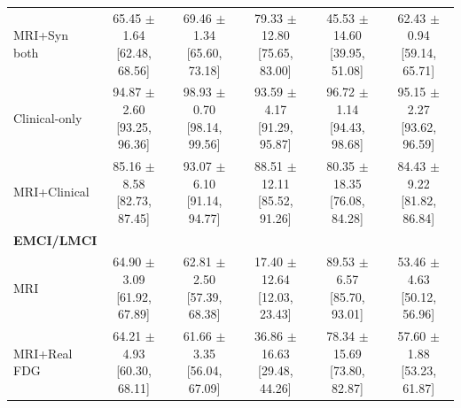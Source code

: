 \documentclass{article}
\begin{document}
\begin{landscape}
\begin{longtable}{lccccc}
MRI+Syn both & \shortstack{65.45 $\pm$ 1.64\\{}[62.48, 68.56]} & \shortstack{69.46 $\pm$ 1.34\\{}[65.60, 73.18]} & \shortstack{79.33 $\pm$ 12.80\\{}[75.65, 83.00]} & \shortstack{45.53 $\pm$ 14.60\\{}[39.95, 51.08]} & \shortstack{62.43 $\pm$ 0.94\\{}[59.14, 65.71]} \\
Clinical-only & \shortstack{94.87 $\pm$ 2.60\\{}[93.25, 96.36]} & \shortstack{98.93 $\pm$ 0.70\\{}[98.14, 99.56]} & \shortstack{93.59 $\pm$ 4.17\\{}[91.29, 95.87]} & \shortstack{96.72 $\pm$ 1.14\\{}[94.43, 98.68]} & \shortstack{95.15 $\pm$ 2.27\\{}[93.62, 96.59]} \\
MRI+Clinical & \shortstack{85.16 $\pm$ 8.58\\{}[82.73, 87.45]} & \shortstack{93.07 $\pm$ 6.10\\{}[91.14, 94.77]} & \shortstack{88.51 $\pm$ 12.11\\{}[85.52, 91.26]} & \shortstack{80.35 $\pm$ 18.35\\{}[76.08, 84.28]} & \shortstack{84.43 $\pm$ 9.22\\{}[81.82, 86.84]} \\
\midrule
\multicolumn{6}{l}{\textbf{EMCI/LMCI}} \\
MRI & \shortstack{64.90 $\pm$ 3.09\\{}[61.92, 67.89]} & \shortstack{62.81 $\pm$ 2.50\\{}[57.39, 68.38]} & \shortstack{17.40 $\pm$ 12.64\\{}[12.03, 23.43]} & \shortstack{89.53 $\pm$ 6.57\\{}[85.70, 93.01]} & \shortstack{53.46 $\pm$ 4.63\\{}[50.12, 56.96]} \\
MRI+Real FDG & \shortstack{64.21 $\pm$ 4.93\\{}[60.30, 68.11]} & \shortstack{61.66 $\pm$ 3.35\\{}[56.04, 67.09]} & \shortstack{36.86 $\pm$ 16.63\\{}[29.48, 44.26]} & \shortstack{78.34 $\pm$ 15.69\\{}[73.80, 82.87]} & \shortstack{57.60 $\pm$ 1.88\\{}[53.23, 61.87]} \\

\end{longtable}
\end{landscape}
\end{document}
